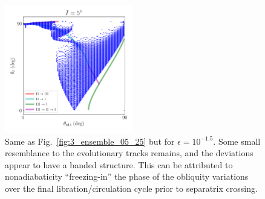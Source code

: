 \documentclass[
        fleqn,
        usenatbib,
    ]{mnras}
\begin{document}
\begin{figure}
    \centering
    \includegraphics[width=0.5\textwidth]{plots_diskdisp/3_ensemble_05_15.png}
    \caption{Same as Fig.~\ref{fig:3_ensemble_05_25} but for $\epsilon =
    10^{-1.5}$. Some small resemblance to the evolutionary tracks remains, and
    the deviations appear to have a banded structure. This can be attributed to
    nonadiabaticity ``freezing-in'' the phase of the obliquity variations over
    the final libration/circulation cycle prior to separatrix
    crossing.}\label{fig:3_ensemble_05_15}
\end{figure}
\end{document}
